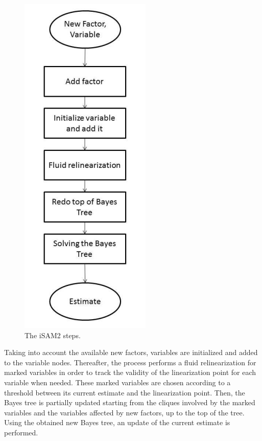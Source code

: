 \documentclass[11pt,openany]{book}
\begin{document}
\begin{figure}[H]
    \centering
    \includegraphics[scale=0.6]{assets/2_13.png}
    \caption{The iSAM2 steps.}
    \label{fig:2.13}
\end{figure}
Taking into account the available new factors, variables are initialized and added to the variable nodes. Thereafter, the process performs a ﬂuid relinearization for marked variables in order to track the validity of the linearization point for each variable when needed. These marked variables are chosen according to a threshold between its current estimate and the linearization point. Then, the Bayes tree is partially updated starting from the cliques involved by the marked variables and the variables aﬀected by new factors, up to the top of the tree. Using the obtained new Bayes tree, an update of the current estimate is performed.
\end{document}
